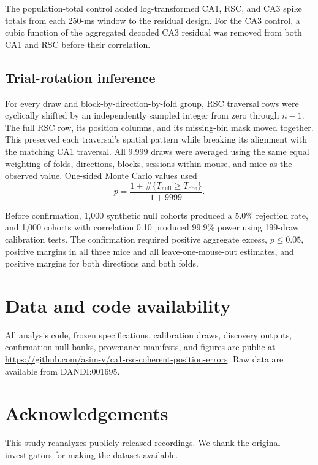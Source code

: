 \documentclass[10pt,twocolumn]{article}
\begin{document}
The population-total control added log-transformed CA1, RSC, and CA3 spike totals from each 250-ms window to the residual design. For the CA3 control, a cubic function of the aggregated decoded CA3 residual was removed from both CA1 and RSC before their correlation.

\subsection{Trial-rotation inference}

For every draw and block-by-direction-by-fold group, RSC traversal rows were cyclically shifted by an independently sampled integer from zero through $n-1$. The full RSC row, its position columns, and its missing-bin mask moved together. This preserved each traversal's spatial pattern while breaking its alignment with the matching CA1 traversal. All 9,999 draws were averaged using the same equal weighting of folds, directions, blocks, sessions within mouse, and mice as the observed value. One-sided Monte Carlo values used
\begin{equation}
p=\frac{1+\#\{T_{\mathrm{null}}\geq T_{\mathrm{obs}}\}}{1+9999}.
\end{equation}

Before confirmation, 1,000 synthetic null cohorts produced a 5.0\% rejection rate, and 1,000 cohorts with correlation 0.10 produced 99.9\% power using 199-draw calibration tests. The confirmation required positive aggregate excess, $p\leq0.05$, positive margins in all three mice and all leave-one-mouse-out estimates, and positive margins for both directions and both folds.

\section*{Data and code availability}

All analysis code, frozen specifications, calibration draws, discovery outputs, confirmation null banks, provenance manifests, and figures are public at \url{https://github.com/asim-v/ca1-rsc-coherent-position-errors}. Raw data are available from DANDI:001695.

\section*{Acknowledgements}

This study reanalyzes publicly released recordings. We thank the original investigators for making the dataset available.
\end{document}
